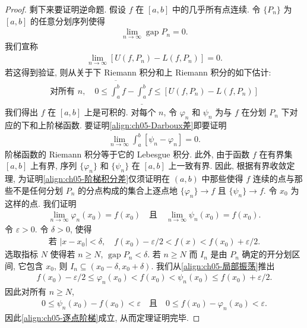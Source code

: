 \documentclass[../../main.tex]{subfiles}
\begin{document}
\begin{proof}
剩下来要证明逆命题. 假设 $f$ 在 $[a,b]$ 中的几乎所有点连续. 令 $\{P_{n}\}$ 为 $[a,b]$ 的任意分划序列使得
\begin{align*}
\lim_{n\to\infty}\operatorname{gap}P_{n}=0.
\end{align*}
我们宣称
\begin{align}
\lim_{n\to\infty}[U(f,P_{n})-L(f,P_{n})]=0.\label{align:ch05-Darboux差}
\end{align}
若这得到验证, 则从关于下 Riemann 积分和上 Riemann 积分的如下估计:
\begin{align*}
\text{对所有 }n,\quad 0\leqslant\overline{\int_{a}^{b}}f-\underline{\int_{a}^{b}}f\leqslant[U(f,P_{n})-L(f,P_{n})]
\end{align*}
我们得出 $f$ 在 $[a,b]$ 上是可积的. 对每个 $n$, 令 $\varphi_{n}$ 和 $\psi_{n}$ 为与 $f$ 在分划 $P_{n}$ 下对应的下和上阶梯函数. 要证明\eqref{align:ch05-Darboux差}即要证明
\begin{align}
\lim_{n\to\infty}\int_{a}^{b}[\psi_{n}-\varphi_{n}]=0.\label{align:ch05-阶梯积分差}
\end{align}
阶梯函数的 Riemann 积分等于它的 Lebesgue 积分. 此外, 由于函数 $f$ 在有界集 $[a,b]$ 上有界, 序列 $\{\varphi_{n}\}$ 和 $\{\psi_{n}\}$ 在 $[a,b]$ 上一致有界. 因此, 根据有界收敛定理, 为证明\eqref{align:ch05-阶梯积分差}仅须证明在 $(a,b)$ 中那些使得 $f$ 连续的点与那些不是任何分划 $P_{n}$ 的分点构成的集合上逐点地 $\{\varphi_{n}\}\to f$ 且 $\{\psi_{n}\}\to f$. 令 $x_{0}$ 为这样的点. 我们证明
\begin{align}
\lim_{n\to\infty}\varphi_{n}(x_{0})=f(x_{0})\quad\text{且}\quad\lim_{n\to\infty}\psi_{n}(x_{0})=f(x_{0}).\label{align:ch05-逐点阶梯}
\end{align}
令 $\varepsilon>0$. 令 $\delta>0$, 使得
\begin{align}
\text{若 }|x-x_{0}|<\delta,\quad f(x_{0})-\varepsilon/2<f(x)<f(x_{0})+\varepsilon/2.\label{align:ch05-局部振荡}
\end{align}
选取指标 $N$ 使得若 $n\geqslant N$, $\operatorname{gap}P_{n}<\delta$. 若 $n\geqslant N$ 而 $I_{n}$ 是由 $P_{n}$ 确定的开分划区间, 它包含 $x_{0}$, 则 $I_{n}\subseteq(x_{0}-\delta,x_{0}+\delta)$. 我们从\eqref{align:ch05-局部振荡}推出
\begin{align*}
f(x_{0})-\varepsilon/2\leqslant\varphi_{n}(x_{0})<f(x_{0})<\psi_{n}(x_{0})\leqslant f(x_{0})+\varepsilon/2.
\end{align*}
因此对所有 $n\geqslant N$,
\begin{align*}
0\leqslant\psi_{n}(x_{0})-f(x_{0})<\varepsilon\quad\text{且}\quad 0\leqslant f(x_{0})-\varphi_{n}(x_{0})<\varepsilon.
\end{align*}
因此\eqref{align:ch05-逐点阶梯}成立, 从而定理证明完毕.
\end{proof}
\end{document}
